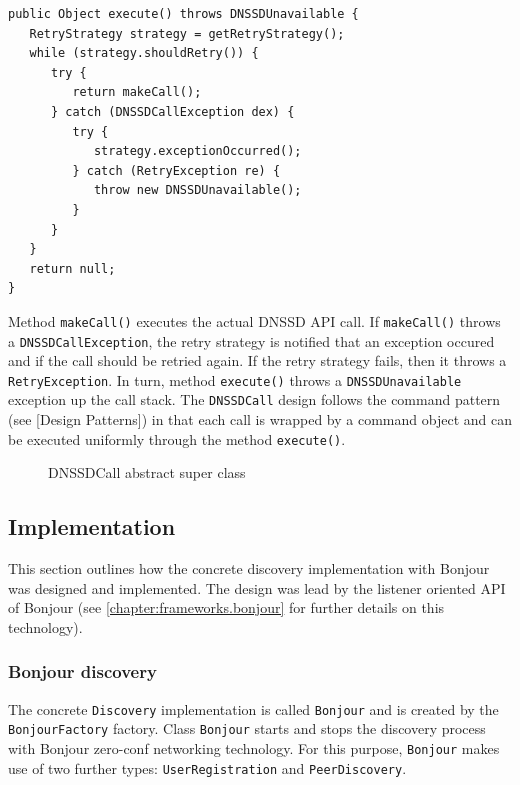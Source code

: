 \begin{verbatim}
public Object execute() throws DNSSDUnavailable {
   RetryStrategy strategy = getRetryStrategy();		
   while (strategy.shouldRetry()) {
      try {
         return makeCall();
      } catch (DNSSDCallException dex) {
         try {
            strategy.exceptionOccurred();
         } catch (RetryException re) {
            throw new DNSSDUnavailable();
         }
      }
   }
   return null;
}
\end{verbatim}

Method \texttt{makeCall()} executes the actual DNSSD API call. If \texttt{makeCall()} throws a \texttt{DNSSD\-Call\-Exception}, the retry strategy is notified that an exception occured and if the call should be retried again. If the retry strategy fails, then it throws a \texttt{RetryException}. In turn, method \texttt{execute()} throws a \texttt{DNSSD\-Unavailable} exception up the call stack. 
The \texttt{DNSSDCall} design follows the command pattern (see [Design Patterns]) in that each call is wrapped by a command object and can be executed uniformly through the method \texttt{execute()}.



\begin{figure}[H]
 \centering
 \caption{DNSSDCall abstract super class}
 \label{fig:network.discovery.dnssdCall}
\end{figure}


\subsection{Implementation}
This section outlines how the concrete discovery implementation with Bonjour was designed and implemented. The design was lead by the listener oriented API of Bonjour (see \ref{chapter:frameworks.bonjour} for further details on this technology).

\subsubsection{Bonjour discovery}
The concrete \texttt{Discovery} implementation is called \texttt{Bonjour} and is created by the \texttt{BonjourFactory} factory. Class \texttt{Bonjour} starts and stops the discovery process with Bonjour zero-conf networking technology. For this purpose,  \texttt{Bonjour} makes use of two further types:  \texttt{UserRegistration} and \texttt{PeerDiscovery}.

